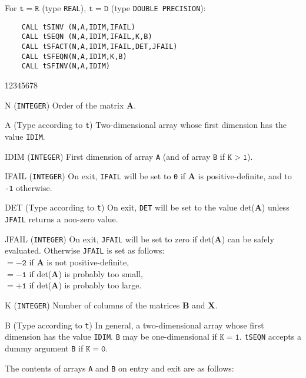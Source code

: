 \Usage
For $\mathtt{t=R}$ (type {\tt REAL}), $\mathtt{t=D}$ (type
{\tt DOUBLE PRECISION}):
\begin{verbatim}
    CALL tSINV (N,A,IDIM,IFAIL)
    CALL tSEQN (N,A,IDIM,IFAIL,K,B)
    CALL tSFACT(N,A,IDIM,IFAIL,DET,JFAIL)
    CALL tSFEQN(N,A,IDIM,K,B)
    CALL tSFINV(N,A,IDIM)
\end{verbatim}
\begin{DLtt}{12345678}
\item [N] ({\tt INTEGER}) Order of the matrix {\bf A}.
\item [A] (Type according to {\tt t}) Two-dimensional array
whose first dimension has the value {\tt IDIM}.
\item [IDIM]({\tt INTEGER}) First dimension
of array {\tt A} (and of array {\tt B} if $\mathtt{K > 1}$).
\item [IFAIL] ({\tt INTEGER}) On exit, {\tt IFAIL} will be set to {\tt 0}
if {\bf A} is positive-definite, and to {\tt -1} otherwise.
\item [DET] (Type according to {\tt t}) On exit, {\tt DET} will be set to
the value det({\bf A}) unless {\tt JFAIL} returns a non-zero value.
\item [JFAIL]({\tt INTEGER}) On exit, {\tt JFAIL} will be set to zero if
det({\bf A}) can be safely evaluated. Otherwise {\tt JFAIL} is set as
follows: \\
$\mathtt{= -2}$ if {\bf A} is not positive-definite, \\
$\mathtt{= -1}$ if det({\bf A}) is probably too small, \\
$\mathtt{= +1}$ if det({\bf A}) is probably too large.
\item [K] ({\tt INTEGER}) Number of columns of the matrices {\bf B}
and {\bf X}.
\item [B] (Type according to {\tt t}) In general, a two-dimensional
array whose first dimension has the value {\tt IDIM}. {\tt B} may be
one-dimensional if $\mathtt{K =1}$. {\tt tSEQN} accepts a dummy argument
{\tt B} if $\mathtt{K = 0}$.
\end{DLtt}
The contents of arrays {\tt A} and {\tt B} on entry
and exit are as follows:

